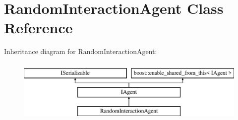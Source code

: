 \hypertarget{class_random_interaction_agent}{}\section{Random\+Interaction\+Agent Class Reference}
\label{class_random_interaction_agent}
Inheritance diagram for Random\+Interaction\+Agent\+:\begin{figure}[H]
\begin{center}
\leavevmode
\includegraphics[height=3.000000cm]{class_random_interaction_agent}
\end{center}
\end{figure}
